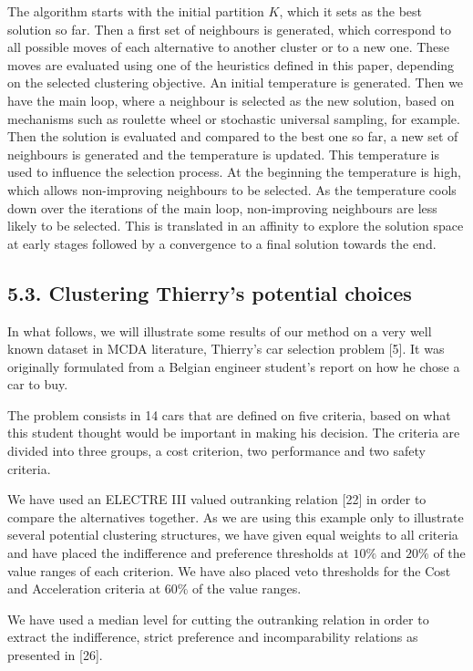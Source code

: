 \documentclass[10pt]{article}
\begin{document}
The algorithm starts with the initial partition $K$, which it sets as the best solution so far. Then a first set of neighbours is generated, which correspond to all possible moves of each alternative to another cluster or to a new one. These moves are evaluated using one of the heuristics defined in this paper, depending on the selected clustering objective. An initial temperature is generated. Then we have the main loop, where a neighbour is selected as the new solution, based on mechanisms such as roulette wheel or stochastic universal sampling, for example. Then the solution is evaluated and compared to the best one so far, a new set of neighbours is generated and the temperature is updated. This temperature is used to influence the selection process. At the beginning the temperature is high, which allows non-improving neighbours to be selected. As the temperature cools down over the iterations of the main loop, non-improving neighbours are less likely to be selected. This is translated in an affinity to explore the solution space at early stages followed by a convergence to a final solution towards the end.

\subsection*{5.3. Clustering Thierry's potential choices}
In what follows, we will illustrate some results of our method on a very well known dataset in MCDA literature, Thierry's car selection problem [5]. It was originally formulated from a Belgian engineer student's report on how he chose a car to buy.

The problem consists in 14 cars that are defined on five criteria, based on what this student thought would be important in making his decision. The criteria are divided into three groups, a cost criterion, two performance and two safety criteria.

We have used an ELECTRE III valued outranking relation [22] in order to compare the alternatives together. As we are using this example only to illustrate several potential clustering structures, we have given equal weights to all criteria and have placed the indifference and preference thresholds at $10 \%$ and $20 \%$ of the value ranges of each criterion. We have also placed veto thresholds for the Cost and Acceleration criteria at $60 \%$ of the value ranges.

We have used a median level for cutting the outranking relation in order to extract the indifference, strict preference and incomparability relations as presented in [26].
\end{document}
